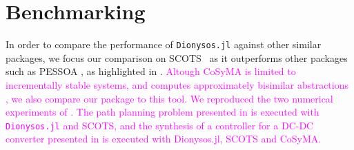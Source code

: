 \documentclass{juliacon}
\begin{document}

\section{Benchmarking}
\label{sec:benchmarks}

In order to compare the performance of \texttt{Dionysos.jl} against other similar packages, we focus our comparison on SCOTS~\cite{rungger2016scots} as it outperforms other packages such as PESSOA \cite{mazo2010pessoa, Roy2011}, as highlighted in \cite{rungger2016scots}. \textcolor{magenta}{Altough CoSyMA is limited to incrementally stable systems, and computes approximately bisimilar abstractions \cite{mouelhi2013cosyma}, we also compare our package to this tool.
We reproduced the two numerical experiments of \cite{rungger2016scots}. The path planning problem presented in \cite[Section 4.1]{rungger2016scots} is executed with \texttt{Dionysos.jl} and SCOTS, and the synthesis of a controller for a DC-DC converter presented in \cite[Section 4.2]{rungger2016scots} is executed with {Dionysos.jl}, SCOTS and CoSyMA.}
\end{document}
